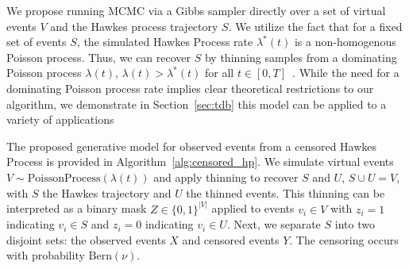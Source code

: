 \documentclass[11pt]{article}
\newcommand{\algrule}[1][.2pt]{\par\vskip.5\baselineskip\hrule height #1\par\vskip.5\baselineskip}
\begin{document}
We propose running MCMC via a Gibbs sampler directly over a set of virtual events $V$ and the Hawkes process trajectory $S$. We utilize the fact that for a fixed set of events $S$, the simulated Hawkes Process rate $\lambda^*(t)$ is a non-homogenous Poisson process. Thus, we can recover $S$ by thinning samples from a dominating Poisson process $\lambda(t)$, $\lambda(t) > \lambda^*(t)$ for all $t \in [0,T]$~\cite{pthin}. While the need for a dominating Poisson process rate implies clear theoretical restrictions to our algorithm, we demonstrate in Section~\ref{sec:tdb} this model can be applied to a variety of applications

The proposed generative model for observed events from a censored Hawkes Process is provided in Algorithm~\ref{alg:censored_hp}. We simulate virtual events $V\sim \text{PoissonProcess}(\lambda(t))$ and apply thinning to recover $S$ and $U$, $S \cup U = V$, with $S$ the Hawkes trajectory and $U$ the thinned events. This thinning can be interpreted as a binary mask $Z \in \{0,1\}^{|V|}$ applied to events $v_i \in V$ with $z_i = 1$ indicating $v_i \in S$ and $z_i = 0$ indicating $v_i \in U$. Next, we separate $S$ into two disjoint sets: the observed events $X$ and censored events $Y$. The censoring occurs with probability $\text{Bern}(\nu)$. %

\end{document}
